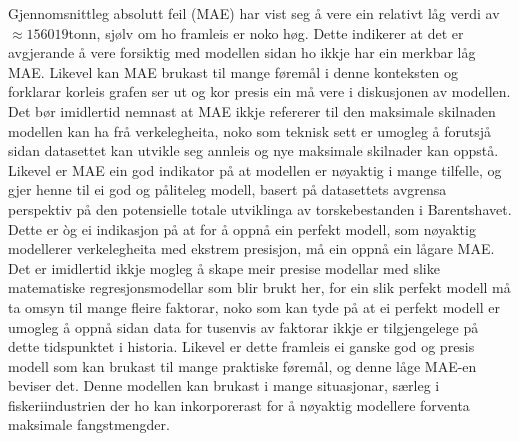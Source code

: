 \documentclass{report}
\begin{document}
Gjennomsnittleg absolutt feil (MAE) har vist seg å vere ein relativt låg verdi av $\approx 156019$tonn, sjølv om ho framleis er noko høg. Dette indikerer at det er avgjerande å vere forsiktig med modellen sidan ho ikkje har ein merkbar låg MAE.
Likevel kan MAE brukast til mange føremål i denne konteksten og forklarar korleis grafen ser ut og kor presis ein må vere i diskusjonen av modellen.
Det bør imidlertid nemnast at MAE ikkje refererer til den maksimale skilnaden modellen kan ha frå verkelegheita, noko som teknisk sett er umogleg å forutsjå sidan datasettet kan utvikle seg annleis og nye maksimale skilnader kan oppstå.
Likevel er MAE ein god indikator på at modellen er nøyaktig i mange tilfelle, og gjer henne til ei god og påliteleg modell, basert på datasettets avgrensa perspektiv på den potensielle totale utviklinga av torskebestanden i Barentshavet.
Dette er òg ei indikasjon på at for å oppnå ein perfekt modell, som nøyaktig modellerer verkelegheita med ekstrem presisjon, må ein oppnå ein lågare MAE. Det er imidlertid ikkje mogleg å skape meir presise modellar med slike matematiske regresjonsmodellar som blir brukt her, for ein slik perfekt modell må ta omsyn til mange fleire faktorar, noko som kan tyde på at ei perfekt modell er umogleg å oppnå sidan data for tusenvis av faktorar ikkje er tilgjengelege på dette tidspunktet i historia.
Likevel er dette framleis ei ganske god og presis modell som kan brukast til mange praktiske føremål, og denne låge MAE-en beviser det. Denne modellen kan brukast i mange situasjonar, særleg i fiskeriindustrien der ho kan inkorporerast for å nøyaktig modellere forventa maksimale fangstmengder.
\end{document}

